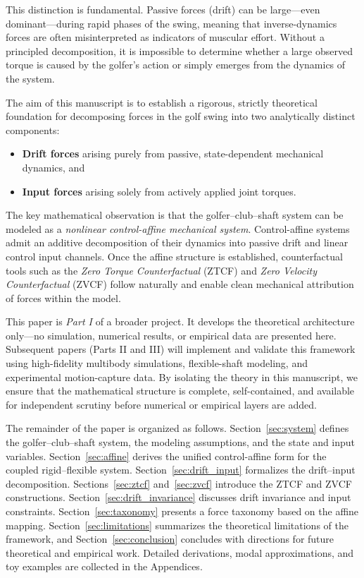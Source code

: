 \documentclass[12pt]{article}
\begin{document}
This distinction is fundamental. Passive forces (drift) can be large---even dominant---during rapid phases of the swing, meaning that inverse-dynamics forces are often misinterpreted as indicators of muscular effort. Without a principled decomposition, it is impossible to determine whether a large observed torque is caused by the golfer's action or simply emerges from the dynamics of the system.

The aim of this manuscript is to establish a rigorous, strictly theoretical foundation for decomposing forces in the golf swing into two analytically distinct components:
\begin{itemize}
  \item \textbf{Drift forces} arising purely from passive, state-dependent mechanical dynamics, and
  \item \textbf{Input forces} arising solely from actively applied joint torques.
\end{itemize}

The key mathematical observation is that the golfer--club--shaft system can be modeled as a \emph{nonlinear control-affine mechanical system}. Control-affine systems admit an additive decomposition of their dynamics into passive drift and linear control input channels. Once the affine structure is established, counterfactual tools such as the \emph{Zero Torque Counterfactual} (ZTCF) and \emph{Zero Velocity Counterfactual} (ZVCF) follow naturally and enable clean mechanical attribution of forces within the model.

This paper is \emph{Part I} of a broader project. It develops the theoretical architecture only---no simulation, numerical results, or empirical data are presented here. Subsequent papers (Parts II and III) will implement and validate this framework using high-fidelity multibody simulations, flexible-shaft modeling, and experimental motion-capture data. By isolating the theory in this manuscript, we ensure that the mathematical structure is complete, self-contained, and available for independent scrutiny before numerical or empirical layers are added.

The remainder of the paper is organized as follows. Section~\ref{sec:system} defines the golfer--club--shaft system, the modeling assumptions, and the state and input variables. Section~\ref{sec:affine} derives the unified control-affine form for the coupled rigid--flexible system. Section~\ref{sec:drift_input} formalizes the drift--input decomposition. Sections~\ref{sec:ztcf} and~\ref{sec:zvcf} introduce the ZTCF and ZVCF constructions. Section~\ref{sec:drift_invariance} discusses drift invariance and input constraints. Section~\ref{sec:taxonomy} presents a force taxonomy based on the affine mapping. Section~\ref{sec:limitations} summarizes the theoretical limitations of the framework, and Section~\ref{sec:conclusion} concludes with directions for future theoretical and empirical work. Detailed derivations, modal approximations, and toy examples are collected in the Appendices.
\end{document}
